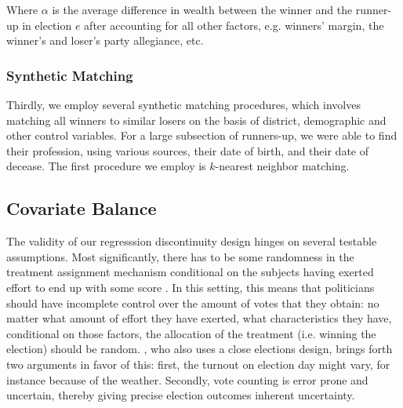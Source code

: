 \documentclass[12pt]{article}
\begin{document}
    Where $\alpha$ is the average difference in wealth between the winner and the runner-up in election $e$ after accounting for all other factors, e.g. winners' margin, the winner's and loser's party allegiance, etc.  

    \subsubsection{Synthetic Matching}

    Thirdly, we employ several synthetic matching procedures, which involves matching all winners to similar losers on the basis of district, demographic and other control variables. For a large subsection of runners-up, we were able to find their profession, using various sources, their date of birth, and their date of decease. The first procedure we employ is $k$-nearest neighbor matching. 

\subsection{Covariate Balance}

The validity of our regresssion discontinuity design hinges on several testable assumptions. Most significantly, there has to be some randomness in the treatment assignment mechanism conditional on the subjects having exerted effort to end up with some score \citep{lee2010regression}. In this setting, this means that politicians should have incomplete control over the amount of votes that they obtain: no matter what amount of effort they have exerted, what characteristics they have, conditional on those factors, the allocation of the treatment (i.e. winning the election) should be random. \cite{lee2008randomized}, who also uses a close elections design, brings forth two arguments in favor of this: first, the turnout on election day might vary, for instance because of the weather. Secondly, vote counting is error prone and uncertain, thereby giving precise election outcomes inherent uncertainty. 
\end{document}

